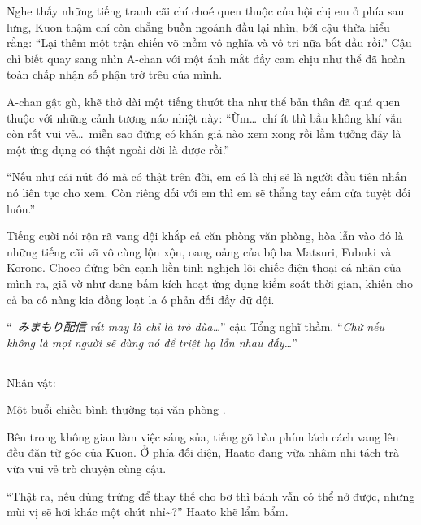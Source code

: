 \documentclass[../main.tex]{subfiles}
\begin{document}
Nghe thấy những tiếng tranh cãi chí choé quen thuộc của hội chị em ở phía sau lưng, Kuon thậm chí còn chẳng buồn ngoảnh đầu lại nhìn, bởi cậu thừa hiểu rằng: ``Lại thêm một trận chiến võ mồm vô nghĩa và vô tri nữa bắt đầu rồi.'' Cậu chỉ biết quay sang nhìn A-chan với một ánh mắt đầy cam chịu như thể đã hoàn toàn chấp nhận số phận trớ trêu của mình.

A-chan gật gù, khẽ thở dài một tiếng thướt tha như thể bản thân đã quá quen thuộc với những cảnh tượng náo nhiệt này: ``Ừm\dots\ chí ít thì bầu không khí vẫn còn rất vui vẻ\dots\ miễn sao đừng có khán giả nào xem xong rồi lầm tưởng đây là một ứng dụng có thật ngoài đời là được rồi.''

``Nếu như cái nút đó mà có thật trên đời, em cá là chị sẽ là người đầu tiên nhấn nó liên tục cho xem. Còn riêng đối với em thì em sẽ thẳng tay cấm cửa tuyệt đối luôn.''

Tiếng cười nói rộn rã vang dội khắp cả căn phòng văn phòng, hòa lẫn vào đó là những tiếng cãi vã vô cùng lộn xộn, oang oảng của bộ ba Matsuri, Fubuki và Korone. Choco đứng bên cạnh liền tinh nghịch lôi chiếc điện thoại cá nhân của mình ra, giả vờ như đang bấm kích hoạt ứng dụng kiểm soát thời gian, khiến cho cả ba cô nàng kia đồng loạt la ó phản đối đầy dữ dội.

``\textit{\hll\ みまもり配信 rất may là chỉ là trò đùa\dots}'' cậu Tổng nghĩ thầm. ``\textit{Chứ nếu không là mọi người sẽ dùng nó để triệt hạ lẫn nhau đấy\dots}''

\newpage

\subsection*{\label{ep-C2.V}}
\begin{center}
  {\caviar\fontsize{12pt}{12pt}\selectfont Nhân vật:      }
\end{center}

Một buổi chiều bình thường tại văn phòng \hll.

Bên trong không gian làm việc sáng sủa, tiếng gõ bàn phím lách cách vang lên đều đặn từ góc của Kuon. Ở phía đối diện, Haato đang vừa nhâm nhi tách trà vừa vui vẻ trò chuyện cùng cậu.

``Thật ra, nếu dùng trứng để thay thế cho bơ thì bánh vẫn có thể nở được, nhưng mùi vị sẽ hơi khác một chút nhỉ\~{}?'' Haato khẽ lẩm bẩm.
\end{document}
